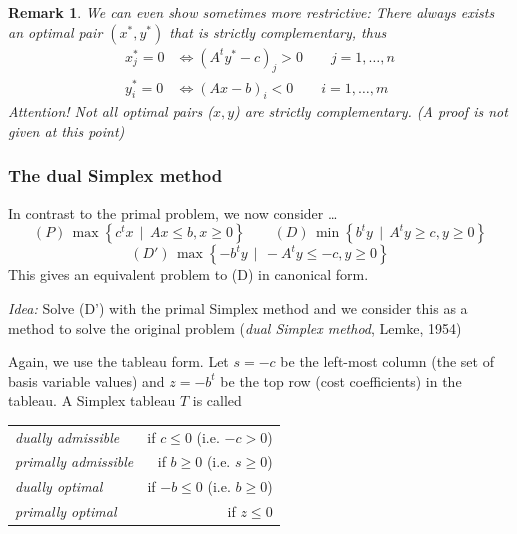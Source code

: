\documentclass[a4paper]{article}
\numberwithin{lecref}{subsection}
\newtheorem*{Remark}{Remark}
\newcommand{\SetDef}[2]{\left\{#1\,\mid\,#2\right\}}
\begin{document}
\begin{Remark}
	We can even show sometimes more restrictive:
	There always exists an optimal pair $(x^*, y^*)$ that is strictly complementary, thus
	\begin{align*}
		x^*_j = 0 &\iff (A^t y^* - c)_j > 0 \qquad j = 1, \dots, n \\
		y^*_i = 0 &\iff (Ax - b)_i < 0 \qquad i = 1, \dots, m
	\end{align*}
	\emph{Attention!} Not all optimal pairs ($x, y$) are strictly complementary. (A proof is not given at this point)
\end{Remark}

\subsubsection{The dual Simplex method}
\label{section:1.4.4}

In contrast to the primal problem, we now consider \dots
\[ (P) \, \max\SetDef{c^t x}{Ax \leq b, x \geq 0} \qquad (D) \, \min\SetDef{b^t y}{A^t y \geq c, y \geq 0} \]
\[ (D') \, \max\SetDef{-b^t y}{-A^t y \leq -c, y \geq 0} \]
This gives an equivalent problem to (D) in canonical form.

\emph{Idea:} Solve (D') with the primal Simplex method and we consider this as a method to solve the original problem (\emph{dual Simplex method}, Lemke, 1954)

Again, we use the tableau form.
Let $s = -c$ be the left-most column (the set of basis variable values) and $z = -b^t$ be the top row (cost coefficients) in the tableau.
A Simplex tableau $T$ is called
\begin{tabular}{lr}
  \emph{dually admissible}\index{Dually admissible Simplex tableau} & if $c \leq 0$ (i.e. $-c > 0$) \\
  \emph{primally admissible}\index{Primally admissible Simplex tableau} & if $b \geq 0$ (i.e. $s \geq 0$) \\
  \emph{dually optimal}\index{Dually optimal Simplex tableau} & if $-b \leq 0$ (i.e. $b \geq 0$) \\
  \emph{primally optimal}\index{Primally optimal Simplex tableau} & if $z \leq 0$
\end{tabular}
\end{document}

